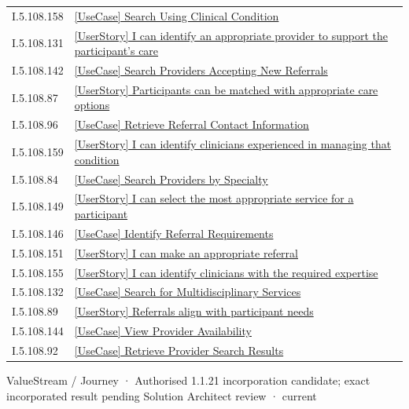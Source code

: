 \begin{longtable}{p{.22\linewidth}p{.73\linewidth}}
I.5.108.158 & \hyperref[element:cce2208664ee4dc48c43cb7194b89039]{[UseCase] Search Using Clinical Condition} \\
I.5.108.131 & \hyperref[element:cd4f3dae85af4ae38f2dd636678dddab]{[UserStory] I can identify an appropriate provider to support the participant's care} \\
I.5.108.142 & \hyperref[element:d0a1ae9a4d584ccc9a2e3df0e8153b1e]{[UseCase] Search Providers Accepting New Referrals} \\
I.5.108.87 & \hyperref[element:d394910a4fc14981a614689672bf2e06]{[UserStory] Participants can be matched with appropriate care options} \\
I.5.108.96 & \hyperref[element:d42e2de8c9ed475d8cbb2a0c27af3a2c]{[UseCase] Retrieve Referral Contact Information} \\
I.5.108.159 & \hyperref[element:d460ae503bc04982994d15ac2ac73ec5]{[UserStory] I can identify clinicians experienced in managing that condition} \\
I.5.108.84 & \hyperref[element:d48c5d84a4a44bc28897f2898fc2e8bc]{[UseCase] Search Providers by Specialty} \\
I.5.108.149 & \hyperref[element:da0ef009f38e40c2a19496f71309a73d]{[UserStory] I can select the most appropriate service for a participant} \\
I.5.108.146 & \hyperref[element:dc526cd73b374274bae80db6f9528b6a]{[UseCase] Identify Referral Requirements} \\
I.5.108.151 & \hyperref[element:e2a2bf3fd8604ac38d6b89f53f6fe357]{[UserStory] I can make an appropriate referral} \\
I.5.108.155 & \hyperref[element:ebebd782ca584dfcb0bc53f0f1b6c455]{[UserStory] I can identify clinicians with the required expertise} \\
I.5.108.132 & \hyperref[element:eccc659b2e9144d7a5a53a7776caa6ce]{[UseCase] Search for Multidisciplinary Services} \\
I.5.108.89 & \hyperref[element:efdeb1c45571492699640126a60de189]{[UserStory] Referrals align with participant needs} \\
I.5.108.144 & \hyperref[element:f29863ac368243ce8e9cc0ebb9789501]{[UseCase] View Provider Availability} \\
I.5.108.92 & \hyperref[element:f5ff1efd4bef4c188a683c1aa03328c5]{[UseCase] Retrieve Provider Search Results} \\
\end{longtable}
\label{element:5d725d797f754857bf1b3d49d8f25044}
{\small ValueStream / Journey · Authorised 1.1.21 incorporation candidate; exact incorporated result pending Solution Architect review · current}\par

